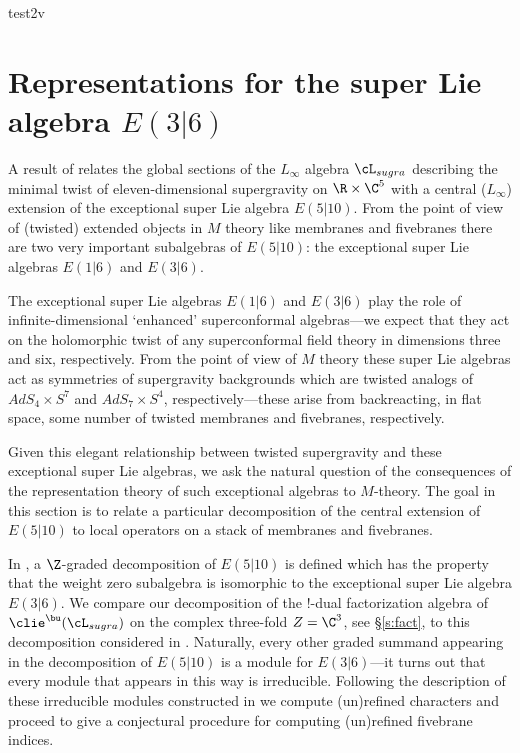 %
%
%

test2v

\section{Representations for the super Lie algebra $E(3|6)$}
\label{s:kr}

A result of \cite{RSW} relates the global sections of the $L_\infty$ algebra $\cL_{sugra}$ describing the minimal twist of eleven-dimensional supergravity on $\R \times \C^5$ with a central ($L_\infty$) extension of the exceptional super Lie algebra $E(5|10)$.
From the point of view of (twisted) extended objects in $M$ theory like membranes and fivebranes there are two very important subalgebras of $E(5|10)$: the exceptional super Lie algebras $E(1|6)$ and $E(3|6)$. 

The exceptional super Lie algebras $E(1|6)$ and $E(3|6)$ play the role of infinite-dimensional `enhanced' superconformal algebras---we expect that they act on the holomorphic twist of any superconformal field theory in dimensions three and six, respectively.
From the point of view of $M$ theory these super Lie algebras act as symmetries of supergravity backgrounds which are twisted analogs of $AdS_4 \times S^7$ and $AdS_7 \times S^4$, respectively---these arise from backreacting, in flat space, some number of twisted membranes and fivebranes, respectively. 

Given this elegant relationship between twisted supergravity and these exceptional super Lie algebras, we ask the natural question of the consequences of the representation theory of such exceptional algebras to $M$-theory. 
The goal in this section is to relate a particular decomposition of the central extension of $E(5|10)$ to local operators on a stack of membranes and fivebranes.

In \cite{KR2}, a $\Z$-graded decomposition of $E(5|10)$ is defined which has the property that the weight zero subalgebra is isomorphic to the exceptional super Lie algebra $E(3|6)$.
We compare our decomposition of the $!$-dual factorization algebra of $\clie^\bu(\cL_{sugra})$ on the complex three-fold $Z = \C^3$, see \S \ref{s:fact}, to this decomposition considered in \cite{KR2}.
Naturally, every other graded summand appearing in the decomposition of $E(5|10)$ is a module for $E(3|6)$---it turns out that every module that appears in this way is irreducible.
Following the description of these irreducible modules constructed in \cite{KR1,KR2} we compute (un)refined characters and proceed to give a conjectural procedure for computing (un)refined fivebrane indices.

